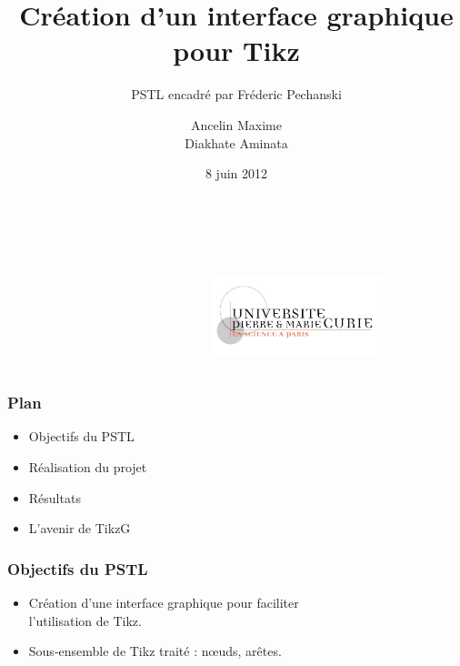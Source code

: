 \documentclass{beamer}
\title[Création d'un interface graphique pour Tikz]{Création d'un interface graphique pour Tikz}
\subtitle{PSTL encadré par Fréderic Pechanski}    %
\author[]{Ancelin Maxime\\Diakhate Aminata}                 %
\institute[UPMC]{M1 Informatique spécialité STL\\UPMC}      %
\date{8 juin 2012}      %
\begin{document}
\newenvironment{violetpar}{\color{violet}}{}
\newenvironment{bluepar}{\par\color{blue}}{\par}
\newenvironment{yellowpar}{\par\color{orange}}{\par}





\begin{frame}
  \titlepage
\ \ \ 
\   \ \ \ \ \ \ \ \ \ \ \ \ \ \ \ \ \ \ \ \ \ \ \ \ \ \ \ \ \ \ \
\includegraphics[width=5cm, height=3cm]{img/LogoUPMC.jpg} 
\end{frame}

\begin{frame}
\frametitle{Plan} 

\begin{itemize}

\item Objectifs du PSTL

\item Réalisation du projet

\item Résultats

\item L'avenir de TikzG


\end{itemize}
\end{frame}

\begin{frame}
\frametitle{Objectifs du PSTL} 


\begin{itemize}

\item Création d'une interface graphique pour
faciliter\\ l'utilisation de Tikz.

\item Sous-ensemble de Tikz traité : nœuds,
arêtes.

\end{itemize}
\end{frame}
\end{document}
